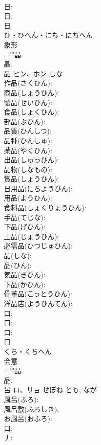 \documentclass[8pt]{extreport}
\begin{document}
\begin{CJK}{UTF8}{min}
\\	日: 
\\	日: 
\\	日	
\\	ひ・ひへん・にち・にちへん	
\\	象形 
\\	=""晶.
\\	晶.
\\	品	ヒン、ホン	しな		
\\	作品(さくひん): 
\\	商品(しょうひん): 
\\	製品(せいひん): 
\\	食品(しょくひん): 
\\	部品(ぶひん): 
\\	品質(ひんしつ): 
\\	品種(ひんしゅ): 
\\	薬品(やくひん): 
\\	出品(しゅっぴん): 
\\	品物(しなもの): 
\\	賞品(しょうひん): 
\\	日用品(にちようひん): 
\\	用品(ようひん): 
\\	食料品(しょくりょうひん): 
\\	手品(てじな): 
\\	下品(げひん): 
\\	上品(じょうひん): 
\\	必需品(ひつじゅひん): 
\\	品(しな): 
\\	品(ひん): 
\\	気品(きひん): 
\\	下品(かひん): 
\\	骨董品(こっとうひん): 
\\	洋品店(ようひんてん): 
\\	口: 
\\	口: 
\\	口: 
\\	口	
\\	くち・くちへん	
\\	会意 
\\	=""品.
\\	品.
\\	呂	ロ、リョ	せぼね	とも, なが	
\\	風呂(ふろ): 
\\	風呂敷(ふろしき): 
\\	お風呂(おふろ): 
\\	口: 
\\	丿: 

\end{CJK}
\end{document}
